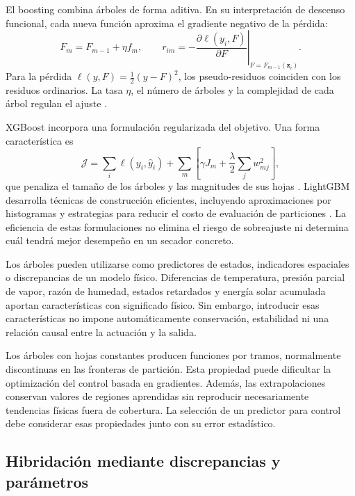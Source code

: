 El boosting combina árboles de forma aditiva. En su interpretación de descenso funcional, cada nueva función aproxima el gradiente negativo de la pérdida:
\begin{equation}
F_m=F_{m-1}+\eta f_m,
\qquad
r_{im}=-\left.
\frac{\partial\ell(y_i,F)}{\partial F}\right|_{F=F_{m-1}(\mathbf z_i)}.
\label{eq:gradient_boosting}
\end{equation}
Para la pérdida $\ell(y,F)=\tfrac12(y-F)^2$, los pseudo-residuos coinciden con los residuos ordinarios. La tasa $\eta$, el número de árboles y la complejidad de cada árbol regulan el ajuste \cite{friedman2001}.

XGBoost incorpora una formulación regularizada del objetivo. Una forma característica es
\begin{equation}
\mathcal J=\sum_i\ell(y_i,\hat y_i)
+\sum_m\left[\gamma J_m+\frac{\lambda}{2}\sum_jw_{mj}^2\right],
\label{eq:objetivo_xgboost}
\end{equation}
que penaliza el tamaño de los árboles y las magnitudes de sus hojas \cite{chen2016}. LightGBM desarrolla técnicas de construcción eficientes, incluyendo aproximaciones por histogramas y estrategias para reducir el costo de evaluación de particiones \cite{ke2017}. La eficiencia de estas formulaciones no elimina el riesgo de sobreajuste ni determina cuál tendrá mejor desempeño en un secador concreto.

Los árboles pueden utilizarse como predictores de estados, indicadores espaciales o discrepancias de un modelo físico. Diferencias de temperatura, presión parcial de vapor, razón de humedad, estados retardados y energía solar acumulada aportan características con significado físico. Sin embargo, introducir esas características no impone automáticamente conservación, estabilidad ni una relación causal entre la actuación y la salida.

Los árboles con hojas constantes producen funciones por tramos, normalmente discontinuas en las fronteras de partición. Esta propiedad puede dificultar la optimización del control basada en gradientes. Además, las extrapolaciones conservan valores de regiones aprendidas sin reproducir necesariamente tendencias físicas fuera de cobertura. La selección de un predictor para control debe considerar esas propiedades junto con su error estadístico.

\subsection{Hibridación mediante discrepancias y parámetros}
\label{subsec:control_modelos_hibridos}

